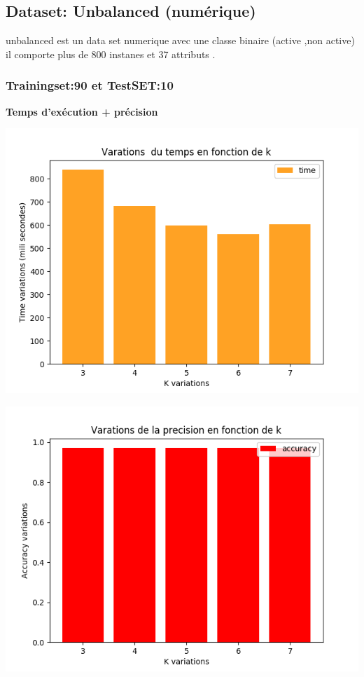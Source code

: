 \documentclass[12pt,a4paper,oneside]{book}
\begin{document}
	

	
	
	
	\subsection{Dataset: Unbalanced (numérique)}
	unbalanced est un data set numerique avec une classe binaire (active ,non active) il comporte plus de 800 instanes et 37 attributs .
	
	\subsubsection{Trainingset:90 et TestSET:10}
	\textbf{Temps d'exécution + précision}\\
	\begin{frame}{}
		\centering
		\begin{minipage}[b]{0.5\linewidth}
			\includegraphics[scale=0.5]{image/data2:Train,90,Test,10time.png}
			\label{labelname}%
		\end{minipage}
		\hspace{0.5cm}
		\begin{minipage}[b]{0.5\linewidth}
			\includegraphics[scale=0.5]{image/data2:Train,80,Test,20:accuracy.png}%

\end{minipage}
\end{frame}
\end{document}
